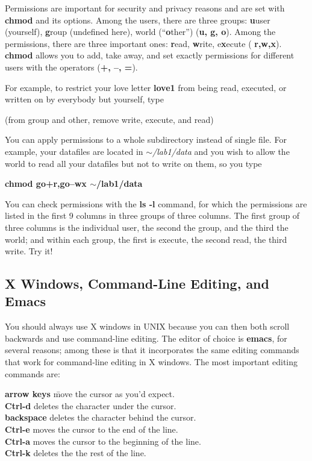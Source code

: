 	Permissions are important for security and privacy reasons and
are set with {\bf chmod} and its options.  Among the users, there are
three groups: {\bf u}user (yourself), {\bf g}roup (undefined here),
world (``{\bf o}ther'') ({\bf u, g, o}).  Among the permissions, there
are three important ones: {\bf r}ead, {\bf w}rite, e{\bf x}ecute ({\bf
r,w,x}).  {\bf chmod} allows you to add, take away, and set exactly
permissions for different users with the operators ({\bf +, --, =}). 

	For example, to restrict your love letter {\bf love1} from being
read, executed, or written on by everybody but yourself, type

 \hspace{0.5in} (from group and other,
remove write, execute, and read)

\noindent You can apply permissions to a whole subdirectory instead of
single file.  For example, your datafiles are located in
\textit{$\sim$/lab1/data} and you wish to allow the world to read all
your datafiles but not to write on them, so you type

\noindent \textbf {chmod go+r,go--wx $\sim$/lab1/data}

	You can check permissions with the {\bf ls -l} command, for
which the permissions are listed in the first 9 columns in three groups
of three columns.  The first group of three columns is the individual
user, the second the group, and the third the world; and within each
group, the first is execute, the second read, the third write.  Try it!

\subsection{X Windows, Command-Line Editing, and Emacs}

\label{keycommands}

	You should always use X windows in UNIX because you can then
both scroll backwards and use command-line editing.  The editor of
choice is {\bf emacs}, for several reasons; among these is that it
incorporates the same editing commands that work for command-line
editing in X windows.  The most important editing commands are:

\begin {tabbing}
{\bf arrow keys} \hspace{0.8in} \= move the cursor as you'd expect. \\
{\bf Ctrl-d} \> deletes the character under the cursor. \\
{\bf backspace} \> deletes the character behind the cursor. \\
{\bf Ctrl-e} \> moves the cursor to the end of the line. \\
{\bf Ctrl-a} \> moves the cursor to the beginning of the line. \\
{\bf Ctrl-k} \> deletes the the rest of the line.
\end{tabbing}

